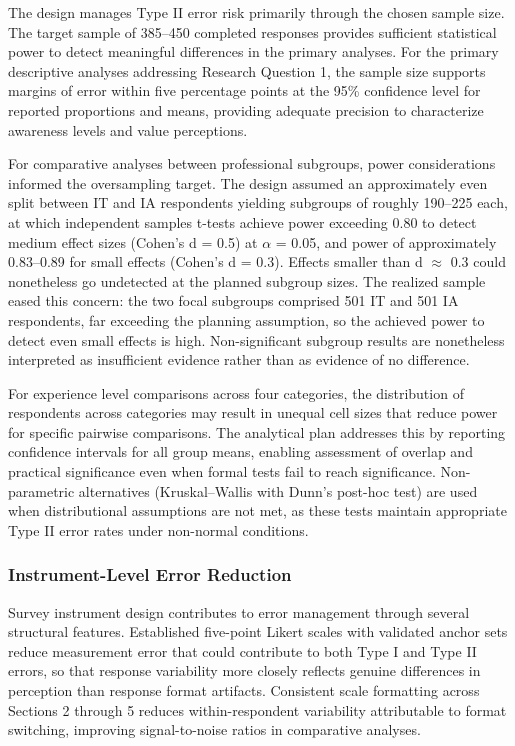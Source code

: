 The design manages Type II error risk primarily through the chosen sample size. The target sample of 385--450 completed responses provides sufficient statistical power to detect meaningful differences in the primary analyses. For the primary descriptive analyses addressing Research Question 1, the sample size supports margins of error within five percentage points at the 95\% confidence level for reported proportions and means, providing adequate precision to characterize awareness levels and value perceptions.

For comparative analyses between professional subgroups, power considerations informed the oversampling target. The design assumed an approximately even split between IT and IA respondents yielding subgroups of roughly 190--225 each, at which independent samples t-tests achieve power exceeding 0.80 to detect medium effect sizes (Cohen's d = 0.5) at \(\alpha\) = 0.05, and power of approximately 0.83--0.89 for small effects (Cohen's d = 0.3). Effects smaller than d \(\approx\) 0.3 could nonetheless go undetected at the planned subgroup sizes. The realized sample eased this concern: the two focal subgroups comprised 501 IT and 501 IA respondents, far exceeding the planning assumption, so the achieved power to detect even small effects is high. Non-significant subgroup results are nonetheless interpreted as insufficient evidence rather than as evidence of no difference.

For experience level comparisons across four categories, the distribution of respondents across categories may result in unequal cell sizes that reduce power for specific pairwise comparisons. The analytical plan addresses this by reporting confidence intervals for all group means, enabling assessment of overlap and practical significance even when formal tests fail to reach significance. Non-parametric alternatives (Kruskal--Wallis with Dunn's post-hoc test) are used when distributional assumptions are not met, as these tests maintain appropriate Type II error rates under non-normal conditions.

\subsubsection{Instrument-Level Error Reduction}

Survey instrument design contributes to error management through several structural features. Established five-point Likert scales with validated anchor sets reduce measurement error that could contribute to both Type I and Type II errors, so that response variability more closely reflects genuine differences in perception than response format artifacts. Consistent scale formatting across Sections 2 through 5 reduces within-respondent variability attributable to format switching, improving signal-to-noise ratios in comparative analyses.

